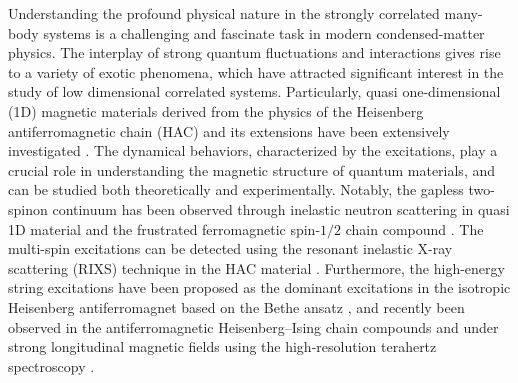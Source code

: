 \documentclass[aps,prx,showpacs,floatfix,twocolumn,superscriptaddress,nofootinbib,longbibliography]{revtex4-2}
\begin{document}
Understanding  the  profound physical nature in the strongly correlated many-body systems is a  challenging and fascinate task in modern condensed-matter physics. The interplay of strong quantum fluctuations and interactions gives rise to  a variety of exotic phenomena, which   have attracted significant interest in the study of low dimensional correlated systems. Particularly, quasi one-dimensional (1D) magnetic materials derived from the physics of the Heisenberg antiferromagnetic chain (HAC) and its extensions have been extensively investigated \cite{Mikeska2004}.
The  dynamical behaviors, characterized by the excitations, play a crucial role in  understanding the magnetic structure of quantum materials, and can be studied both theoretically and experimentally. Notably, 
 the gapless two-spinon continuum \cite{karbach97}  has been observed through inelastic neutron scattering in quasi 1D material  \cite{tennant93,lake13} and   the
frustrated ferromagnetic spin-$1/2$ chain compound  \cite{PhysRevLett.104.237207}. The multi-spin excitations can be detected using the 
resonant inelastic X-ray scattering (RIXS) technique \cite{PhysRevLett.106.157205,RIXS2018NC} in the HAC material . Furthermore, the high-energy string excitations have  been proposed as the dominant excitations in the isotropic Heisenberg antiferromagnet based on the Bethe ansatz \cite{PhysRevLett.102.037203}, and  recently  been observed in the antiferromagnetic Heisenberg–Ising chain compounds  and  under strong longitudinal magnetic fields using the high-resolution terahertz spectroscopy  \cite{wang2018experimental,PRL2019ZheWang}.
\end{document}
